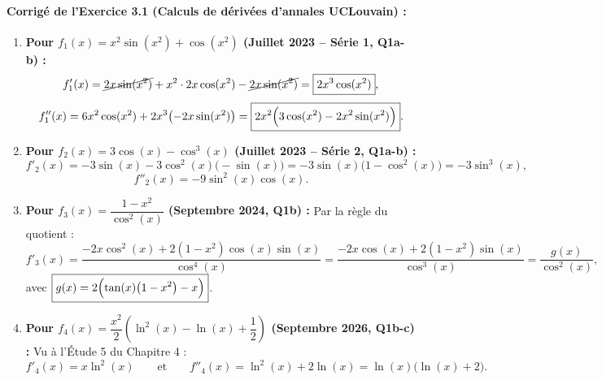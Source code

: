 \paragraph{Corrigé de l'Exercice 3.1 (Calculs de dérivées d'annales UCLouvain) :}
\begin{enumerate}[label=(\alph*)]
    \item \textbf{Pour $f_1(x) = x^2\sin(x^2) + \cos(x^2)$ (Juillet 2023 -- Série 1, Q1a-b) :}
    \[
        f'_1(x) = \cancel{2x\sin(x^2)} + x^2\cdot 2x\cos(x^2) - \cancel{2x\sin(x^2)} = \boxed{2x^3\cos(x^2)},
    \]
    \[
        f''_1(x) = 6x^2\cos(x^2) + 2x^3\bigl(-2x\sin(x^2)\bigr) = \boxed{2x^2\Bigl(3\cos(x^2) - 2x^2\sin(x^2)\Bigr)}.
    \]
    \item \textbf{Pour $f_2(x) = 3\cos(x) - \cos^3(x)$ (Juillet 2023 -- Série 2, Q1a-b) :}
    \[
        f'_2(x) = -3\sin(x) - 3\cos^2(x)\bigl(-\sin(x)\bigr) = -3\sin(x)\bigl(1 - \cos^2(x)\bigr) = \boxed{-3\sin^3(x)},
    \]
    \[
        f''_2(x) = \boxed{-9\sin^2(x)\cos(x)}.
    \]
    \item \textbf{Pour $f_3(x) = \dfrac{1 - x^2}{\cos^2(x)}$ (Septembre 2024, Q1b) :} Par la règle du quotient :
    \[
        f'_3(x) = \frac{-2x\cos^2(x) + 2(1 - x^2)\cos(x)\sin(x)}{\cos^4(x)} = \frac{-2x\cos(x) + 2(1-x^2)\sin(x)}{\cos^3(x)} = \frac{g(x)}{\cos^2(x)},
    \]
    avec $\boxed{g(x) = 2\Bigl(\tan(x)\bigl(1 - x^2\bigr) - x\Bigr)}$.
    \item \textbf{Pour $f_4(x) = \dfrac{x^2}{2}\left(\ln^2(x) - \ln(x) + \dfrac{1}{2}\right)$ (Septembre 2026, Q1b-c) :} Vu à l'Étude 5 du Chapitre 4 :
    \[
        \boxed{f'_4(x) = x\ln^2(x)} \qquad \text{et} \qquad \boxed{f''_4(x) = \ln^2(x) + 2\ln(x) = \ln(x)\bigl(\ln(x) + 2\bigr)}.
    \]
\end{enumerate}

